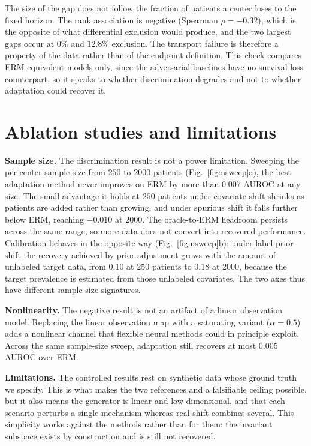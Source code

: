 The size of the gap does not follow the fraction of patients a center loses to
the fixed horizon. The rank association is negative (Spearman $\rho=-0.32$),
which is the opposite of what differential exclusion would produce, and the two
largest gaps occur at $0\%$ and $12.8\%$ exclusion. The transport failure is
therefore a property of the data rather than of the endpoint definition. This
check compares ERM-equivalent models only, since the adversarial baselines have
no survival-loss counterpart, so it speaks to whether discrimination degrades
and not to whether adaptation could recover it.


\section{Ablation studies and limitations}
\label{sec:ablation}

\textbf{Sample size.}
The discrimination result is not a power limitation. Sweeping the per-center
sample size from $250$ to $2000$ patients (Fig.~\ref{fig:nsweep}a), the best
adaptation method never improves on ERM by more than $0.007$ AUROC at any size.
The small advantage it holds at $250$ patients under covariate shift shrinks as
patients are added rather than growing, and under spurious shift it falls
further below ERM, reaching $-0.010$ at $2000$. The oracle-to-ERM headroom
persists across the same range, so more data does not convert into recovered
performance. Calibration behaves in the opposite way (Fig.~\ref{fig:nsweep}b):
under label-prior shift the recovery achieved by prior adjustment grows with the
amount of unlabeled target data, from $0.10$ at $250$ patients to $0.18$ at
$2000$, because the target prevalence is estimated from those unlabeled
covariates. The two axes thus have different sample-size signatures.

\textbf{Nonlinearity.}
The negative result is not an artifact of a linear observation model. Replacing
the linear observation map with a saturating variant ($\alpha=0.5$) adds a
nonlinear channel that flexible neural methods could in principle exploit.
Across the same sample-size sweep, adaptation still recovers at most $0.005$
AUROC over ERM.

\textbf{Limitations.}
The controlled results rest on synthetic data whose ground truth we specify.
This is what makes the two references and a falsifiable ceiling possible, but it
also means the generator is linear and low-dimensional, and that each scenario
perturbs a single mechanism whereas real shift combines several. This simplicity
works against the methods rather than for them: the invariant subspace exists by
construction and is still not recovered.

